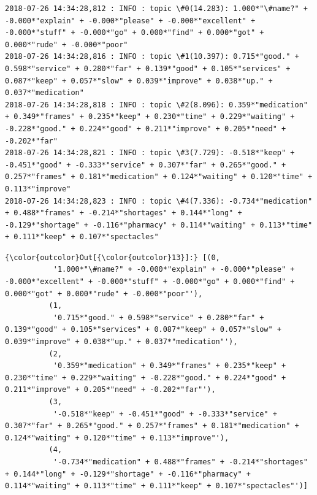 \documentclass[11pt]{article}
\begin{document}
    \begin{Verbatim}[commandchars=\\\{\}]
2018-07-26 14:34:28,812 : INFO : topic \#0(14.283): 1.000*"\#name?" + -0.000*"explain" + -0.000*"please" + -0.000*"excellent" + -0.000*"stuff" + -0.000*"go" + 0.000*"find" + 0.000*"got" + 0.000*"rude" + -0.000*"poor"
2018-07-26 14:34:28,816 : INFO : topic \#1(10.397): 0.715*"good." + 0.598*"service" + 0.280*"far" + 0.139*"good" + 0.105*"services" + 0.087*"keep" + 0.057*"slow" + 0.039*"improve" + 0.038*"up." + 0.037*"medication"
2018-07-26 14:34:28,818 : INFO : topic \#2(8.096): 0.359*"medication" + 0.349*"frames" + 0.235*"keep" + 0.230*"time" + 0.229*"waiting" + -0.228*"good." + 0.224*"good" + 0.211*"improve" + 0.205*"need" + -0.202*"far"
2018-07-26 14:34:28,821 : INFO : topic \#3(7.729): -0.518*"keep" + -0.451*"good" + -0.333*"service" + 0.307*"far" + 0.265*"good." + 0.257*"frames" + 0.181*"medication" + 0.124*"waiting" + 0.120*"time" + 0.113*"improve"
2018-07-26 14:34:28,823 : INFO : topic \#4(7.336): -0.734*"medication" + 0.488*"frames" + -0.214*"shortages" + 0.144*"long" + -0.129*"shortage" + -0.116*"pharmacy" + 0.114*"waiting" + 0.113*"time" + 0.111*"keep" + 0.107*"spectacles"

    \end{Verbatim}

\begin{Verbatim}[commandchars=\\\{\}]
{\color{outcolor}Out[{\color{outcolor}13}]:} [(0,
           '1.000*"\#name?" + -0.000*"explain" + -0.000*"please" + -0.000*"excellent" + -0.000*"stuff" + -0.000*"go" + 0.000*"find" + 0.000*"got" + 0.000*"rude" + -0.000*"poor"'),
          (1,
           '0.715*"good." + 0.598*"service" + 0.280*"far" + 0.139*"good" + 0.105*"services" + 0.087*"keep" + 0.057*"slow" + 0.039*"improve" + 0.038*"up." + 0.037*"medication"'),
          (2,
           '0.359*"medication" + 0.349*"frames" + 0.235*"keep" + 0.230*"time" + 0.229*"waiting" + -0.228*"good." + 0.224*"good" + 0.211*"improve" + 0.205*"need" + -0.202*"far"'),
          (3,
           '-0.518*"keep" + -0.451*"good" + -0.333*"service" + 0.307*"far" + 0.265*"good." + 0.257*"frames" + 0.181*"medication" + 0.124*"waiting" + 0.120*"time" + 0.113*"improve"'),
          (4,
           '-0.734*"medication" + 0.488*"frames" + -0.214*"shortages" + 0.144*"long" + -0.129*"shortage" + -0.116*"pharmacy" + 0.114*"waiting" + 0.113*"time" + 0.111*"keep" + 0.107*"spectacles"')]
\end{Verbatim}
            
\end{document}
